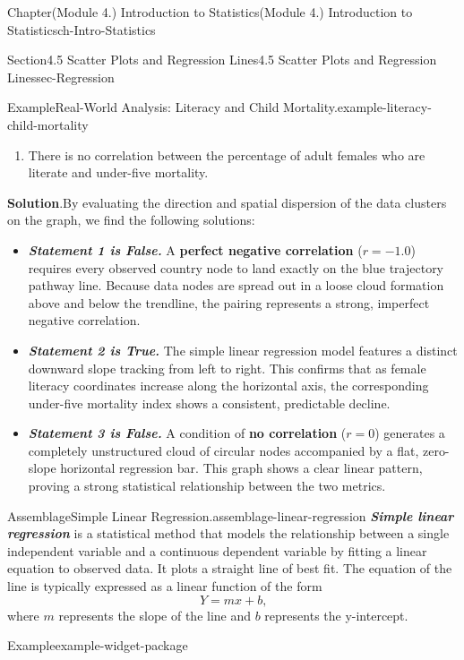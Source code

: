 \documentclass[oneside,10pt,]{book}
\newcommand{\blocktitlefont}{\relax}
\newcommand{\ptxlistdisc}{\raisebox{0.3ex}{\textbullet}}
\newcommand{\alert}[1]{\textbf{\textit{#1}}}
\newcommand{\terminology}[1]{\textbf{#1}}
\begin{document}
\begin{chapterptx}{Chapter}{(Module 4.) Introduction to Statistics}{}{(Module 4.) Introduction to Statistics}{}{}{ch-Intro-Statistics}
\begin{sectionptx}{Section}{4.5 Scatter Plots and Regression Lines}{}{4.5 Scatter Plots and Regression Lines}{}{}{sec-Regression}
\begin{example}{Example}{Real-World Analysis: Literacy and Child Mortality.}{example-literacy-child-mortality}
\begin{enumerate}[label={\arabic*}]
\item{}There is no correlation between the percentage of adult females who are literate and under-five mortality.%
\end{enumerate}
%
\par\smallskip%
\noindent\textbf{\blocktitlefont Solution}.\hypertarget{example-literacy-child-mortality-3}{}\quad{}By evaluating the direction and spatial dispersion of the data clusters on the graph, we find the following solutions:%
\par
%
\begin{itemize}[label=\ptxlistdisc]
\item{}\alert{Statement 1 is False.} A \terminology{perfect negative correlation} (\(r = -1.0\)) requires every observed country node to land exactly on the blue trajectory pathway line. Because data nodes are spread out in a loose cloud formation above and below the trendline, the pairing represents a strong, imperfect negative correlation.%
\item{}\alert{Statement 2 is True.} The simple linear regression model features a distinct downward slope tracking from left to right. This confirms that as female literacy coordinates increase along the horizontal axis, the corresponding under-five mortality index shows a consistent, predictable decline.%
\item{}\alert{Statement 3 is False.} A condition of \terminology{no correlation} (\(r = 0\)) generates a completely unstructured cloud of circular nodes accompanied by a flat, zero-slope horizontal regression bar. This graph shows a clear linear pattern, proving a strong statistical relationship between the two metrics.%
\end{itemize}
%
\end{example}
\begin{assemblage}{Assemblage}{Simple Linear Regression.}{assemblage-linear-regression}%
\alert{Simple linear regression} is a statistical method that models the relationship between a single independent variable and a continuous dependent variable by fitting a linear equation to observed data. It plots a straight line of best fit. The equation of the line is typically expressed as a linear function of the form%
\begin{equation*}
Y = mx + b\text{,}
\end{equation*}
where \(m\) represents the slope of the line and \(b\) represents the y-intercept.%
\end{assemblage}
\begin{example}{Example}{}{example-widget-package}%

\end{example}
\end{sectionptx}
\end{chapterptx}
\end{document}
